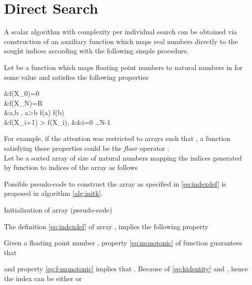 \documentclass[preprint,1p,times]{elsarticle}
\begin{document}
\section{Direct Search}
\label{sec:directmethod}
A scalar algorithm with complexity  per individual search can be obtained via construction of an auxiliary function which maps real numbers  directly to the sought indices  according with the following simple procedure.

Let  be a function which maps floating point numbers  to natural numbers in  for some value  and satisfies the following properties

&f(X_0)=0 \\
&f(X_N)=R \label{eq:lastf} \\
&\forall a,b \in[X_{0},X_{N}], \; a>b \implies f(a) \geq f(b) \label{eq:monotonic} \\
&f(X_{i+1}) > f(X_i), &&\quad  i=0 \dots N-1 \label{eq:f-monotonic}

For example, if the attention was restricted to arrays  such that , a function  satisfying these properties could be the \textit{floor} operator . \\
Let  be a sorted array of size  of natural numbers mapping the indices  generated by function  to indices of the array  as follows

Possible pseudo-code to construct the array  as specified in \eqref{eq:indexdef} is proposed in algorithm \eqref{alg:initk}.
\begin{algorithm}[ht]
	\caption{Initialization of array  (pseudo-code)}
	\label{alg:initk}
	\begin{algorithmic}
		\State {}
		\State {}
		\Repeat
			\State {}
			\While {}  
				\State {}
				\State {}
			\EndWhile

			\State {}   		
			\State {}
			\State {}
		
			\State 
		\Until{  }
		\EndFunction
	\end{algorithmic}
\end{algorithm}

\noindent The definition \eqref{eq:indexdef} of array , implies the following property

Given a floating point number , property \eqref{eq:monotonic} of function  guarantees that

and property \eqref{eq:f-monotonic} implies that . Because of \eqref{eq:kidentity}  and , hence the index  can be either  or 
\end{document}
